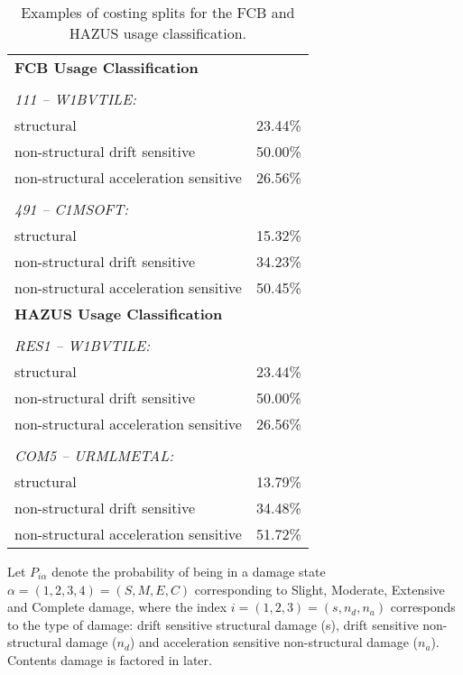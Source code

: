 \begin{table}
\centering \caption{Examples of costing splits for the
FCB and HAZUS usage
classification.}
\label{tab:grids-costproportions}  \vspace{0.8em}
\begin{tabular}{|l|l|}

 \hline
\textbf{FCB Usage Classification} &  \\
 & \\
\textit{111 -- W1BVTILE:} & \\
structural & 23.44\%\\
non-structural drift sensitive & 50.00\%\\
non-structural acceleration sensitive & 26.56\%\\
 & \\
\textit{491 -- C1MSOFT:} & \\
structural & 15.32\%\\
non-structural drift sensitive & 34.23\%\\
non-structural acceleration sensitive & 50.45\%\\
\hline
\textbf{HAZUS Usage Classification} &  \\
 & \\
\textit{RES1  -- W1BVTILE:} & \\
structural & 23.44\%\\
non-structural drift sensitive & 50.00\% \\
non-structural acceleration sensitive & 26.56\%\\
 & \\
\textit{COM5 -- URMLMETAL:} & \\
structural & 13.79\%\\
non-structural drift sensitive & 34.48\%\\
non-structural acceleration sensitive & 51.72\%\\
\hline
\end{tabular}
\end{table}

Let $P_{i \alpha}$ denote the probability of being in a damage
state $\alpha=(1,2,3,4)=(S,M,E,C)$ corresponding to Slight,
Moderate, Extensive and Complete damage, where the index
$i=(1,2,3)=(s, n_d, n_a)$ corresponds to the type of damage: drift
sensitive structural damage (s), drift sensitive non-structural
damage ($n_d$) and acceleration sensitive non-structural damage
($n_a$). Contents damage is factored in later.

